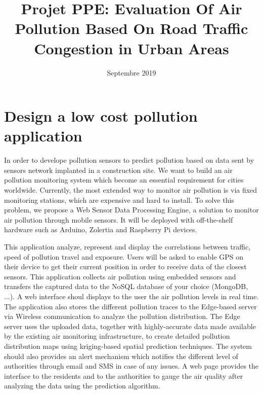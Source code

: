 \documentclass[a4paper]{article}
\title{\textbf{Projet PPE:} Evaluation Of Air Pollution Based On  Road Traffic Congestion in Urban Areas}
\date{Septembre 2019}
\begin{document}
\maketitle



\section{Design a low cost pollution application}

In order to develope pollution sensors to predict pollution based on data sent by sensors network implanted in a construction site\cite{alvear_architecture_2016,rosmiati_air_2019}.
We want to build an air pollution monitoring system which become an essential requirement for cities worldwide.
Currently,
	the most extended way to monitor air pollution is via fixed monitoring stations\cite{paredes-parra_alternative_2019},
	which are expensive and hard to install.
To solve this problem,
	we propose a Web Sensor Data Processing Engine,
	a solution to monitor air pollution through mobile sensors.
It will be deployed with off-the-shelf hardware such as Arduino, Zolertia and Raspberry Pi devices.

This application analyze,
	represent and display the correlations between traffic,
	speed of pollution travel and exposure.
Users will be asked to enable GPS on their device to get their current position in order to receive data of the closest sensors.
This application collects air pollution using embedded sensors and transfers the captured data to the NoSQL database of your choice (MongoDB, ...).
A web interface shoul displays to the user the air pollution levels in real time.
The application also stores the different pollution traces to the Edge-based server via Wireless communication to analyze the pollution distribution.
The Edge server uses the uploaded data,
	together with highly-accurate data made available by the existing air monitoring infrastructure,
	to create detailed pollution distribution maps using kriging-based spatial prediction techniques.
The system should also provides an alert mechanism which notifies the different level of authorities through email and SMS in case of any issues.
A web page provides the interface to the residents and to the authorities to gauge the air quality after analyzing the data using the prediction algorithm.
\end{document}
